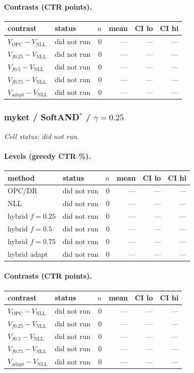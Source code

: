 \documentclass[10pt,a4paper]{article}
\begin{document}
\paragraph{Contrasts (CTR points).}
{\centering\small\begin{tabular}{llrrrr}
\toprule contrast & status & $n$ & mean & CI lo & CI hi \\
\midrule
$V_{\mathrm{OPC}}-V_{\mathrm{NLL}}$ & did not run & 0 & --- & --- & --- \\
$V_{f0.25}-V_{\mathrm{NLL}}$ & did not run & 0 & --- & --- & --- \\
$V_{f0.5}-V_{\mathrm{NLL}}$ & did not run & 0 & --- & --- & --- \\
$V_{f0.75}-V_{\mathrm{NLL}}$ & did not run & 0 & --- & --- & --- \\
$V_{\mathrm{adapt}}-V_{\mathrm{NLL}}$ & did not run & 0 & --- & --- & --- \\
\bottomrule\end{tabular}\par}
\bigskip
\subsubsection{myket / SoftAND$^*$ / $\gamma=0.25$}
\emph{Cell status: did not run}.
\paragraph{Levels (greedy CTR \%).}
{\centering\small\begin{tabular}{llrrrr}
\toprule method & status & $n$ & mean & CI lo & CI hi \\
\midrule
OPC/DR & did not run & 0 & --- & --- & --- \\
NLL & did not run & 0 & --- & --- & --- \\
hybrid $f{=}0.25$ & did not run & 0 & --- & --- & --- \\
hybrid $f{=}0.5$ & did not run & 0 & --- & --- & --- \\
hybrid $f{=}0.75$ & did not run & 0 & --- & --- & --- \\
hybrid adapt & did not run & 0 & --- & --- & --- \\
\bottomrule\end{tabular}\par}
\paragraph{Contrasts (CTR points).}
{\centering\small\begin{tabular}{llrrrr}
\toprule contrast & status & $n$ & mean & CI lo & CI hi \\
\midrule
$V_{\mathrm{OPC}}-V_{\mathrm{NLL}}$ & did not run & 0 & --- & --- & --- \\
$V_{f0.25}-V_{\mathrm{NLL}}$ & did not run & 0 & --- & --- & --- \\
$V_{f0.5}-V_{\mathrm{NLL}}$ & did not run & 0 & --- & --- & --- \\
$V_{f0.75}-V_{\mathrm{NLL}}$ & did not run & 0 & --- & --- & --- \\
$V_{\mathrm{adapt}}-V_{\mathrm{NLL}}$ & did not run & 0 & --- & --- & --- \\
\bottomrule\end{tabular}\par}
\end{document}

